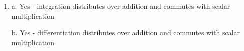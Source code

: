 \documentclass{article}
\newcommand{\chapternumber}{2}
\newenvironment{QandA}{\begin{enumerate}[label=\chapternumber.\arabic*]\bfseries\boldmath}
	{\end{enumerate}}
\newenvironment{answered}{\par\bigskip\normalfont\unboldmath}{}
\begin{document}
\begin{QandA}
\begin{answered}
\[\begin{pmatrix}
				1 & 1 & -1 & 1 \\
				0 & 1 & -1 & -1 \\
				0 & 0 & 1 & 3 \\
			\end{pmatrix}
			\begin{pmatrix}
				a \\ b \\ c \\ d 
			\end{pmatrix}
			= 0
			\]
			From this we see that we have completely free choice over the value of $d$, at which point $a,b,c$ are completely determined. In particular we see that $c = -3d$, and so our general form for $v$ is
			\[v=
			c
			\begin{pmatrix}
				1 \\
				1 \\
				1 \\
			\end{pmatrix}
			+ d
			\begin{pmatrix}
				-1 \\
				1 \\
				-3 \\
			\end{pmatrix}
			=
			-3d
			\begin{pmatrix}
				1 \\
				1 \\
				1 \\
			\end{pmatrix}
			+ d
			\begin{pmatrix}
				-1 \\
				1 \\
				-3 \\
			\end{pmatrix}
			= d
			\begin{pmatrix}
				-4 \\
				-2 \\
				-6 \\
			\end{pmatrix}\]
			which is exactly the answer we got in part b.
		\end{answered}
		
		\item 
		\begin{answered}
			a. Yes - integration distributes over addition and commutes with scalar multiplication
			
			b. Yes - differentiation distributes over addition and commutes with scalar multiplication
			

\end{answered}
\end{QandA}
\end{document}
